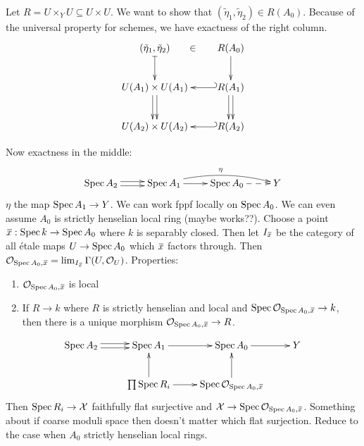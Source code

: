 Let $R=U\times_Y U\subseteq U\times U$. We want to show that $(\tilde
\eta_1,\tilde \eta_2)\in R(A_0)$. Because of the universal property
for schemes, we have exactness of the right column.
\[\xymatrix{
  (\tilde \eta_1, \tilde \eta_2)\ar@{}[r]|{\mbox{$\in$}} \ar@{|->}[d]
&R(A_0)\ar[d]\\
  U(A_1)\times U(A_1)\ar@<.5ex>[d]\ar@<-.5ex>[d] &
R(A_1)\ar@<.5ex>[d]\ar@<-.5ex>[d] \ar@{_(->}[l]\\
  U(A_2)\times U(A_2) & R(A_2)\ar@{_(->}[l]
}\]

Now exactness in the middle:
\[\xymatrix{
  \spec A_2\ar@<.5ex>[r]\ar@<-.5ex>[r] & \spec A_1\ar[r]
\ar@/^2ex/[rr]^\eta & \spec A_0 \ar@{-->}[r] & Y
}\]
$\eta$ the map $\operatorname{Spec} A_1\to Y$. We can work fppf locally on $\operatorname{Spec}
A_0$. We can even assume $A_0$ is strictly henselian local ring
(maybe works??). Choose a point $\bbar x:\spec k\to \spec A_0$ where
$k$ is separably closed. Then let $I_{\bbar x}$ be the category of
all \'etale maps $U\to \operatorname{Spec} A_0$ which $\bbar x$ factors through.
Then $\O_{\spec A_0,\bbar x} = \lim_{I_{\bbar x}} \Ga(U,\O_U)$.
Properties:
\begin{enumerate}
  \item $\O_{\spec A_0,\bbar x}$ is local
  \item If $R\to k$ where $R$ is strictly henselian and local and
$\spec \O_{\spec A_0,\bbar x}\to k$, then there is a unique morphism
$\O_{\spec A_0,\bbar x}\to R$.
\end{enumerate}
\[\xymatrix{
  \spec A_2\ar@<.5ex>[r]\ar@<-.5ex>[r] & \spec A_1\ar[r] & \spec
A_0\ar[r] & Y\\
  & \prod \spec R_i\ar[u]\ar[r] & \spec \O_{\spec A_0,\bbar x}\ar[u]
}\]
Then $\operatorname{Spec} R_i\to \mathcal{X}$ faithfully flat surjective and $\X\to \spec
\O_{\spec A_0,\bbar x}$. Something about if coarse moduli space then
doesn't matter which flat surjection. Reduce to the case when $A_0$
strictly henselian local rings.
